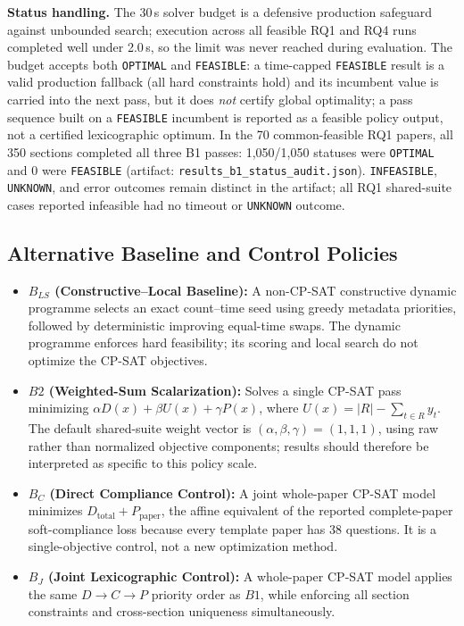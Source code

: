 \documentclass[runningheads]{llncs}
\begin{document}
\noindent\textbf{Status handling.} The 30\,s solver budget is a defensive production safeguard against unbounded search; execution across all feasible RQ1 and RQ4 runs completed well under 2.0\,s, so the limit was never reached during evaluation. The budget accepts both \texttt{OPTIMAL} and \texttt{FEASIBLE}: a time-capped \texttt{FEASIBLE} result is a valid production fallback (all hard constraints hold) and its incumbent value is carried into the next pass, but it does \emph{not} certify global optimality; a pass sequence built on a \texttt{FEASIBLE} incumbent is reported as a feasible policy output, not a certified lexicographic optimum. In the 70 common-feasible RQ1 papers, all 350 sections completed all three B1 passes: 1,050/1,050 statuses were \texttt{OPTIMAL} and 0 were \texttt{FEASIBLE} (artifact: \texttt{results\_b1\_status\_audit.json}). \texttt{INFEASIBLE}, \texttt{UNKNOWN}, and error outcomes remain distinct in the artifact; all RQ1 shared-suite cases reported infeasible had no timeout or \texttt{UNKNOWN} outcome.

\subsection{Alternative Baseline and Control Policies}
\begin{itemize}\setlength{\itemsep}{1pt}\setlength{\parskip}{0pt}
    \item \textbf{$B_{LS}$ (Constructive--Local Baseline):} A non-CP-SAT constructive dynamic programme selects an exact count--time seed using greedy metadata priorities, followed by deterministic improving equal-time swaps. The dynamic programme enforces hard feasibility; its scoring and local search do not optimize the CP-SAT objectives.
    \item \textbf{$B2$ (Weighted-Sum Scalarization):} Solves a single CP-SAT pass minimizing $\alpha D(x) + \beta U(x) + \gamma P(x)$, where $U(x) = |R| - \sum_{t\in R} y_t$. The default shared-suite weight vector is $(\alpha,\beta,\gamma)=(1,1,1)$, using raw rather than normalized objective components; results should therefore be interpreted as specific to this policy scale.
    \item \textbf{$B_C$ (Direct Compliance Control):} A joint whole-paper CP-SAT model minimizes $D_{\mathrm{total}}+P_{\mathrm{paper}}$, the affine equivalent of the reported complete-paper soft-compliance loss because every template paper has 38 questions. It is a single-objective control, not a new optimization method.
    \item \textbf{$B_J$ (Joint Lexicographic Control):} A whole-paper CP-SAT model applies the same $D\!\to\!C\!\to\!P$ priority order as $B1$, while enforcing all section constraints and cross-section uniqueness simultaneously.
\end{itemize}
\end{document}
